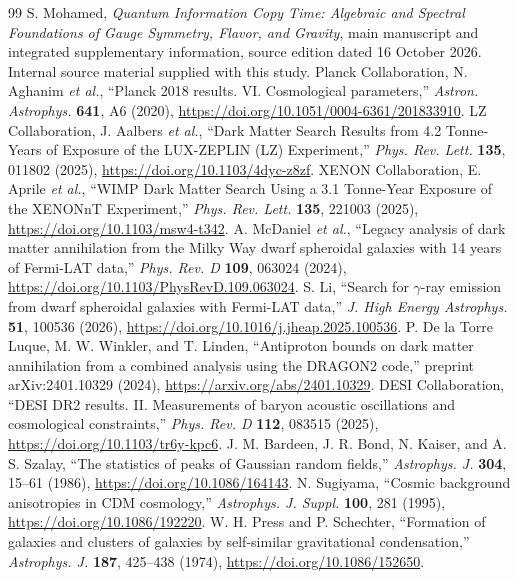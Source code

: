 \begin{thebibliography}{99}\small\setlength{\itemsep}{1pt}
 S. Mohamed, \emph{Quantum Information Copy Time: Algebraic and Spectral Foundations of Gauge Symmetry, Flavor, and Gravity}, main manuscript and integrated supplementary information, source edition dated 16 October 2026. Internal source material supplied with this study.
 Planck Collaboration, N. Aghanim \emph{et al.}, ``Planck 2018 results. VI. Cosmological parameters,'' \emph{Astron. Astrophys.} \textbf{641}, A6 (2020), \url{https://doi.org/10.1051/0004-6361/201833910}.
 LZ Collaboration, J. Aalbers \emph{et al.}, ``Dark Matter Search Results from 4.2 Tonne-Years of Exposure of the LUX-ZEPLIN (LZ) Experiment,'' \emph{Phys. Rev. Lett.} \textbf{135}, 011802 (2025), \url{https://doi.org/10.1103/4dyc-z8zf}.
 XENON Collaboration, E. Aprile \emph{et al.}, ``WIMP Dark Matter Search Using a 3.1 Tonne-Year Exposure of the XENONnT Experiment,'' \emph{Phys. Rev. Lett.} \textbf{135}, 221003 (2025), \url{https://doi.org/10.1103/msw4-t342}.
 A. McDaniel \emph{et al.}, ``Legacy analysis of dark matter annihilation from the Milky Way dwarf spheroidal galaxies with 14 years of Fermi-LAT data,'' \emph{Phys. Rev. D} \textbf{109}, 063024 (2024), \url{https://doi.org/10.1103/PhysRevD.109.063024}.
 S. Li, ``Search for $\gamma$-ray emission from dwarf spheroidal galaxies with Fermi-LAT data,'' \emph{J. High Energy Astrophys.} \textbf{51}, 100536 (2026), \url{https://doi.org/10.1016/j.jheap.2025.100536}.
 P. De la Torre Luque, M. W. Winkler, and T. Linden, ``Antiproton bounds on dark matter annihilation from a combined analysis using the DRAGON2 code,'' preprint arXiv:2401.10329 (2024), \url{https://arxiv.org/abs/2401.10329}.
 DESI Collaboration, ``DESI DR2 results. II. Measurements of baryon acoustic oscillations and cosmological constraints,'' \emph{Phys. Rev. D} \textbf{112}, 083515 (2025), \url{https://doi.org/10.1103/tr6y-kpc6}.
 J. M. Bardeen, J. R. Bond, N. Kaiser, and A. S. Szalay, ``The statistics of peaks of Gaussian random fields,'' \emph{Astrophys. J.} \textbf{304}, 15--61 (1986), \url{https://doi.org/10.1086/164143}.
 N. Sugiyama, ``Cosmic background anisotropies in CDM cosmology,'' \emph{Astrophys. J. Suppl.} \textbf{100}, 281 (1995), \url{https://doi.org/10.1086/192220}.
 W. H. Press and P. Schechter, ``Formation of galaxies and clusters of galaxies by self-similar gravitational condensation,'' \emph{Astrophys. J.} \textbf{187}, 425--438 (1974), \url{https://doi.org/10.1086/152650}.

\end{thebibliography}
